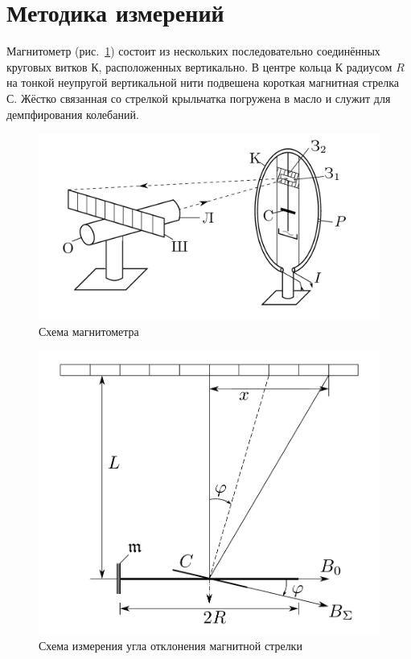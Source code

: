 \documentclass[a4paper, 12pt]{article}
\begin{document}
\section{Методика измерений}

Магнитометр (рис.~\ref{ris1}) состоит из нескольких последовательно соединённых круговых витков К, расположенных вертикально. В центре кольца К радиусом $R$ на тонкой неупругой вертикальной нити подвешена короткая магнитная стрелка С. Жёстко связанная со стрелкой крыльчатка погружена в масло и служит для демпфирования колебаний.

\begin{figure}[h!]
\begin{center}
    \includegraphics[scale=2.4]{1.png}
\end{center}
\caption{Схема магнитометра}
\label{ris1}
\end{figure}

\begin{figure}[h!]
\begin{center}
    \includegraphics[scale=2.4]{2.png}
\end{center}
\caption{Схема измерения угла отклонения магнитной стрелки}
\label{ris2}
\end{figure}
\end{document}

